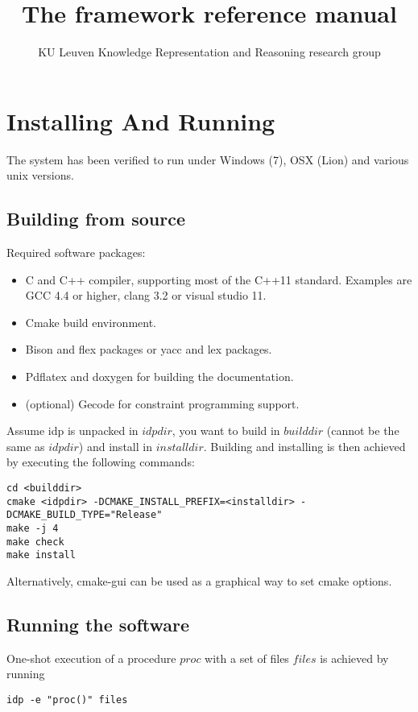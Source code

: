 \documentclass[a4]{article}
\title{The \idp framework reference manual}
\author{KU Leuven Knowledge Representation and Reasoning research group}
\begin{document}
\maketitle
\setlength{\parindent}{0pt}
\newpage
\tableofcontents
\newpage


\section{Installing And Running}

The system has been verified to run under Windows (7), OSX (Lion) and various unix versions.

\subsection{Building from source}
Required software packages:
\begin{itemize}
  \item C and C++ compiler, supporting most of the C++11 standard. Examples are GCC 4.4 or higher, clang 3.2 or visual studio 11.
  \item Cmake build environment. 
  \item Bison and flex packages or yacc and lex packages.
  \item Pdflatex and doxygen for building the documentation.
  \item (optional) Gecode for constraint programming support.
\end{itemize}

Assume idp is unpacked in $idpdir$, you want to build in $builddir$ (cannot be the same as $idpdir$) and install in $installdir$. Building and installing is then achieved by executing the following commands:
\begin{lstlisting}
cd <builddir>
cmake <idpdir> -DCMAKE_INSTALL_PREFIX=<installdir> -DCMAKE_BUILD_TYPE="Release"
make -j 4
make check
make install
\end{lstlisting}

Alternatively, cmake-gui can be used as a graphical way to set cmake options.

\subsection{Running the software}
One-shot execution of a procedure $proc$ with a set of files $files$ is achieved by running
\begin{lstlisting}
idp -e "proc()" files
\end{lstlisting}
\end{document}
